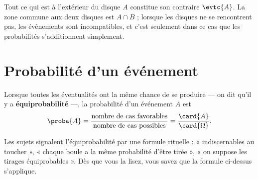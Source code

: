 \begin{visualisation}
\begin{center}
\end{center}

Tout ce qui est à l'extérieur du disque $A$ constitue son contraire
$\evtc{A}$. La zone commune aux deux disques est $A \cap B$ ; lorsque les
disques ne se rencontrent pas, les événements sont incompatibles, et c'est
seulement dans ce cas que les probabilités s'additionnent simplement.
\end{visualisation}

\section{Probabilité d'un événement}

\begin{definition}
Lorsque toutes les éventualités ont la même chance de se produire — on dit
qu'il y a \textbf{équiprobabilité} —, la probabilité d'un événement $A$ est
\[
  \proba{A} = \frac{\text{nombre de cas favorables}}
                   {\text{nombre de cas possibles}}
            = \frac{\card{A}}{\card{\Omega}} .
\]
\end{definition}

\begin{remarque}
Les sujets signalent l'équiprobabilité par une formule rituelle :
« indiscernables au toucher », « chaque boule a la même probabilité d'être
tirée », « on suppose les tirages équiprobables ». Dès que vous la lisez,
vous savez que la formule ci-dessus s'applique.
\end{remarque}

